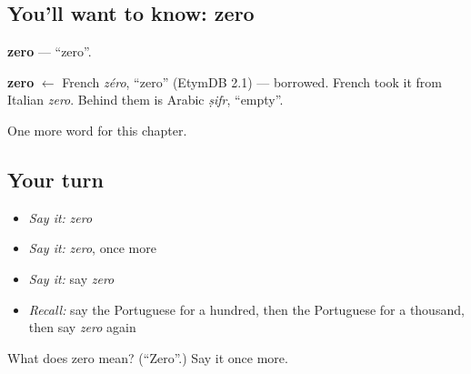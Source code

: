 \subsection*{You'll want to know: zero}
\textbf{zero} — \textquotedblleft{}zero\textquotedblright{}.

\begin{cousinweb}
\textbf{zero} $\leftarrow$ French \emph{zéro}, \textquotedblleft{}zero\textquotedblright{} (EtymDB 2.1) — borrowed. French took it from Italian \emph{zero}. Behind them is Arabic \emph{ṣifr}, \textquotedblleft{}empty\textquotedblright{}.
\end{cousinweb}

\begin{grammarlens}[title={What you've built}]
One more word for this chapter.
\end{grammarlens}

\subsection*{Your turn}
\begin{itemize}
\raggedright
  \item \emph{Say it:} \emph{zero}
  \item \emph{Say it:} \emph{zero}, once more
  \item \emph{Say it:} say \emph{zero}
  \item \emph{Recall:} say the Portuguese for a hundred, then the Portuguese for a thousand, then say \emph{zero} again
\end{itemize}

\begin{tcolorbox}[breakable,colback=teal!4,colframe=teal!35!black,title={Before you move on}]
What does zero mean? (\textquotedblleft{}Zero\textquotedblright{}.) Say it once more.
\end{tcolorbox}
